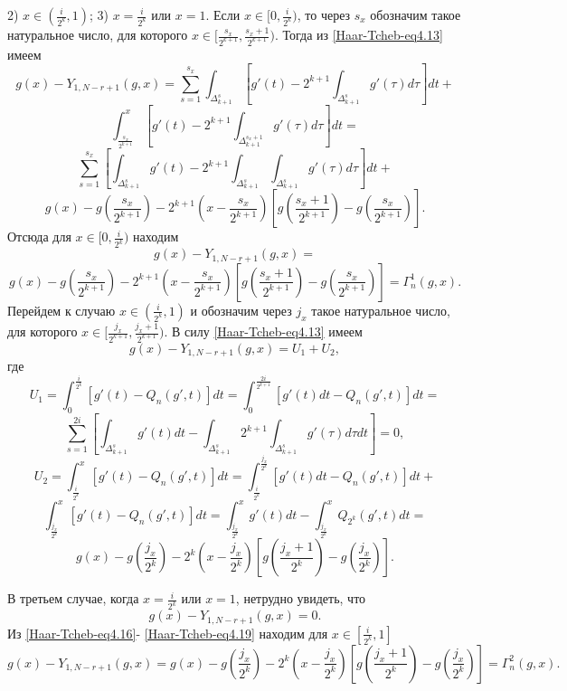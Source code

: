 2) $x\in(\frac{i}{2^k},1)$; 3) $x=\frac{i}{2^k}$ или $x=1$. Если $x\in[0,\frac{i}{2^k})$, то через $s_x$ обозначим такое натуральное число, для которого $x\in [\frac{s_x}{2^{k+1}},\frac{s_x+1}{2^{k+1}}) $.
Тогда из \eqref{Haar-Tcheb-eq4.13} имеем
$$
g(x)-Y_{1,N-r+1}(g,x)=\sum_{s=1}^{s_x} \int_{\Delta_{k+1}^s}\left[g'(t)-2^{k+1}\int_{\Delta_{k+1}^s}g'(\tau)d\tau \right]dt+
$$
$$
\int_{\frac{s_x}{2^{k+1}}}^x \left[g'(t)-2^{k+1}\int_{\Delta_{k+1}^{s_x+1}}g'(\tau)d\tau \right]dt=
$$
$$
\sum_{s=1}^{s_x}\left[\int_{\Delta_{k+1}^s}g'(t)-2^{k+1}\int_{\Delta_{k+1}^s}
\int_{\Delta_{k+1}^s}g'(\tau)d\tau \right]dt+
$$
$$
g(x)-g(\frac{s_x}{2^{k+1}})-2^{k+1}(x-\frac{s_x}{2^{k+1}})\left[g(\frac{s_x+1}{2^{k+1}})-g(\frac{s_x}{2^{k+1}}) \right].
$$
Отсюда для $x\in[0,\frac{i}{2^k})$ находим
$$
g(x)-Y_{1,N-r+1}(g,x)=
$$
\begin{equation}\label{Haar-Tcheb-eq4.15}
g(x)-g(\frac{s_x}{2^{k+1}})-2^{k+1}
(x-\frac{s_x}{2^{k+1}})\left[g(\frac{s_x+1}{2^{k+1}})-g(\frac{s_x}{2^{k+1}}) \right]=\Gamma_n^1(g,x).
\end{equation}
Перейдем к случаю $x\in(\frac{i}{2^k},1)$ и обозначим через $j_x$  такое натуральное число, для которого $x\in [\frac{j_x}{2^{k+1}},\frac{j_x+1}{2^{k+1}}) $. В силу \eqref{Haar-Tcheb-eq4.13} имеем
\begin{equation}\label{Haar-Tcheb-eq4.16}
g(x)-Y_{1,N-r+1}(g,x)=U_1+U_2,
\end{equation}
где
$$
U_1=\int_0^\frac{i}{2^k} [g'(t)- Q_{n}(g',t)]dt=\int_0^\frac{2i}{2^{k+1}} [g'(t)dt- Q_{n}(g',t)]dt=
$$
\begin{equation}\label{Haar-Tcheb-eq4.17}
\sum_{s=1}^{2i}\left[\int_{\Delta_{k+1}^s}g'(t)dt- \int_{\Delta_{k+1}^s}2^{k+1}\int_{\Delta_{k+1}^s}g'(\tau)d\tau dt\right]=0,
\end{equation}
$$
U_2=\int_\frac{i}{2^k}^x [g'(t)- Q_{n}(g',t)]dt=\int_\frac{i}{2^k}^\frac{j_x}{2^k} [g'(t)dt- Q_{n}(g',t)]dt+
$$
$$
\int_\frac{j_x}{2^k}^x [g'(t)- Q_{n}(g',t)]dt=\int_\frac{j_x}{2^k}^x g'(t)dt-\int_\frac{j_x}{2^k}^x  Q_{2^k}(g',t)dt=
$$
\begin{equation}\label{Haar-Tcheb-eq4.18}
 g(x)-g(\frac{j_x}{2^k})-2^k(x-\frac{j_x}{2^k})[g(\frac{j_x+1}{2^k})-g(\frac{j_x}{2^k})].
\end{equation}

В третьем случае, когда $x=\frac{i}{2^k}$ или $x=1$, нетрудно увидеть, что
\begin{equation}\label{Haar-Tcheb-eq4.19}
 g(x)-Y_{1,N-r+1}(g,x)=0.
 \end{equation}
Из \eqref{Haar-Tcheb-eq4.16}- \eqref{Haar-Tcheb-eq4.19} находим для $x\in[\frac{i}{2^k},1]$
\begin{equation}\label{Haar-Tcheb-eq4.20}
 g(x)-Y_{1,N-r+1}(g,x)=
 g(x)-g(\frac{j_x}{2^k})-2^k(x-\frac{j_x}{2^k})[g(\frac{j_x+1}{2^k})-g(\frac{j_x}{2^k})]=
 \Gamma_n^2(g,x).
 \end{equation}

